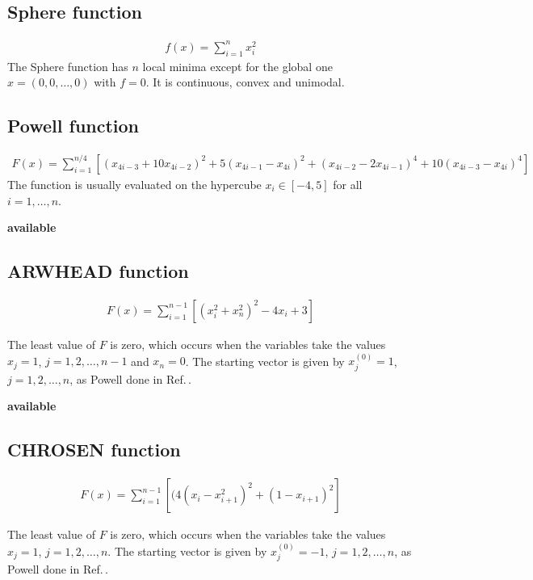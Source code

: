\documentclass[final,1p,times]{elsarticle}
\begin{document}
\subsection{Sphere function}
\label{subsec:sphere}

\begin{align}
	f(x) = \sum_{i=1}^n x_i^2
	\label{}
\end{align}
The Sphere function has $n$ local minima except for the
global one $x=(0,0,\dots,0)$ with $f=0$.
It is continuous, convex and unimodal. 

\subsection{Powell function}
\label{subsec:powell}

\begin{align}
	F(x) = \sum_{i=1}^{n/4}[(x_{4i-3}+10 x_{4i-2})^2 +
	5(x_{4i-1}-x_{4i})^2 + (x_{4i-2}-2 x_{4i-1})^4 +
	10(x_{4i-3}-x_{4i})^4]
	\label{}
\end{align}
The function is usually evaluated on the hypercube $x_i\in[-4,5]$
for all $i=1,\dots,n$.

\textbf{available}


\subsection{ARWHEAD function}
\label{subsec:ARWHEAD}

\begin{align}
	F(x) = \sum_{i=1}^{n-1}[(x_i^2+x_n^2)^2 - 4 x_i +3]
	\label{}
\end{align}

The least value of $F$ is zero, which occurs when the variables take the values
$x_j=1$, $j=1,2,\dots,n-1$ and $x_n=0$. 
The starting vector is given by $x_j^{(0)}=1$, $j=1,2,\dots,n$, as
Powell done in Ref.\,\cite{powell2006newuoa}.

\textbf{available}

\subsection{CHROSEN function}
\label{subsec:CHROSEN}

\begin{align}
	F(x) = \sum_{i=1}^{n-1}[(4(x_i-x_{i+1}^2)^2 + (1-x_{i+1})^2]
	\label{} \end{align}

The least value of $F$ is zero, which occurs when the variables take the values
$x_j=1$, $j=1,2,\dots,n$.
The starting vector is given by $x_j^{(0)}=-1$, $j=1,2,\dots,n$, as
Powell done in Ref.\,\cite{powell2006newuoa}. 
\end{document}
